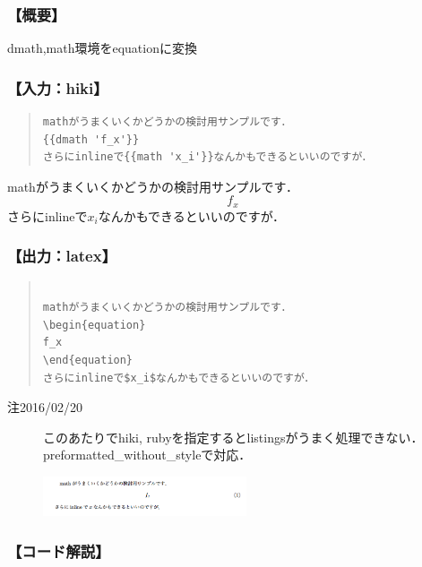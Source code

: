 
\subsubsection{【概要】}
dmath,math環境をequationに変換

\subsubsection{【入力：hiki】}\begin{quote}\begin{verbatim}
mathがうまくいくかどうかの検討用サンプルです．
{{dmath 'f_x'}}
さらにinlineで{{math 'x_i'}}なんかもできるといいのですが．
\end{verbatim}\end{quote}
mathがうまくいくかどうかの検討用サンプルです．
\begin{equation}
f_x
\end{equation}
さらにinlineで$x_i$なんかもできるといいのですが．

\subsubsection{【出力：latex】}\begin{quote}\begin{verbatim}

mathがうまくいくかどうかの検討用サンプルです．
\begin{equation}
f_x
\end{equation}
さらにinlineで$x_i$なんかもできるといいのですが．
\end{verbatim}\end{quote}\begin{description}
\item[注2016/02/20] このあたりでhiki, rubyを指定するとlistingsがうまく処理できない．preformatted\_without\_styleで対応．

\end{description}
\begin{figure}[htbp]\begin{center}
\includegraphics[width=6cm]{./Math.png}
\caption{}
\label{default}\end{center}\end{figure}
\subsubsection{【コード解説】}
